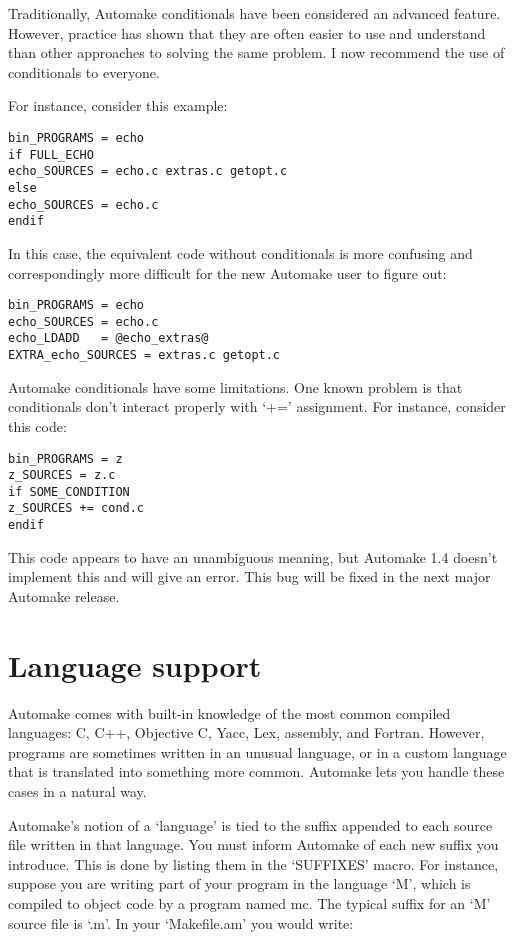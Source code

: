 Traditionally, Automake conditionals have been considered an advanced feature. However, practice has shown that they are often easier to use and understand than other approaches to solving the same problem. I now recommend the use of conditionals to everyone.

For instance, consider this example: 

\begin{Verbatim}[frame=single]
bin_PROGRAMS = echo
if FULL_ECHO
echo_SOURCES = echo.c extras.c getopt.c
else
echo_SOURCES = echo.c
endif
\end{Verbatim}

In this case, the equivalent code without conditionals is more confusing and correspondingly more difficult for the new Automake user to figure out:

\begin{Verbatim}[frame=single]
bin_PROGRAMS = echo
echo_SOURCES = echo.c
echo_LDADD   = @echo_extras@
EXTRA_echo_SOURCES = extras.c getopt.c
\end{Verbatim}

Automake conditionals have some limitations. One known problem is 
that conditionals don't interact properly with `+=' assignment. For 
instance, consider this code:

\begin{Verbatim}[frame=single]
bin_PROGRAMS = z
z_SOURCES = z.c
if SOME_CONDITION
z_SOURCES += cond.c
endif
\end{Verbatim}

This code appears to have an unambiguous meaning, but Automake 1.4 doesn't implement this and will give an error. This bug will be fixed in the next major Automake release.

\section{Language support}

Automake comes with built-in knowledge of the most common compiled languages: C, C++, Objective C, Yacc, Lex, assembly, and Fortran. However, programs are sometimes written in an unusual language, or in a custom language that is translated into something more common. Automake lets you handle these cases in a natural way.

Automake's notion of a `language' is tied to the suffix appended to each source file written in that language. You must inform Automake of each new suffix you introduce. This is done by listing them in the `SUFFIXES' macro. For instance, suppose you are writing part of your program in the language `M', which is compiled to object code by a program named mc. The typical suffix for an `M' source file is `.m'. In your `Makefile.am' you would write: 

